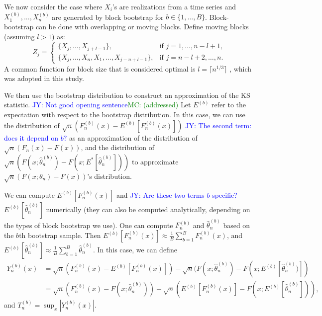 \documentclass[12pt, titlepage, letterpaper]{article}
\newcommand{\jy}[1]{\textcolor{blue}{JY: #1}}
\newcommand{\mc}[1]{\textcolor{green}{MC: (#1)}}
\begin{document}
{We now consider the case where $X_i$'s are realizations from a time series and
$X^{(b)}_1,...,X^{(b)}_n$ are generated by block bootstrap for 
$b \in \{1, \ldots, B\}$.  
Block-bootstrap can be done with overlapping or moving blocks.
Define 
moving blocks (assuming $l > 1$) as:
\begin{equation*}
Z_j =
    \begin{cases}
        \{X_j, \ldots, X_{j + l - 1}\}, & \text{if } j = 1, \dots, n - l + 1,\\
        \{X_j, \ldots, X_n, X_1, \ldots, X_{j-n+l-1}\}, & \text{if } j = n - l
        + 2 ,\dots, n.
    \end{cases}
\end{equation*}
A common 
function for block size that is considered optimal is 
$l = \lceil n^{1/3} \rceil$ \citep{buhlmann1999block},  
which was adopted in this study.


We then use the bootstrap distribution to construct an approximation of
the KS statistic.
\jy{Not good opening sentence}\mc{addressed}
Let $E^{(b)}$ refer to the expectation with respect to
the bootstrap distribution. In this case, we can 
use the distribution of $\sqrt{n}(F^{(b)}_n(x) - E^{(b)}[F^{(b)}_n(x)])$
\jy{The second term: does it depend on $b$? }
as an approximation of the distribution of
$\sqrt{n}(F_n(x) - F(x))$,
and the distribution of 
$\sqrt{n}(F(x; \hat\theta^{(b)}_n) - F(x; E^*[\hat\theta^{(b)}_n]))$ to
approximate $\sqrt{n}(F(x; \theta_n) - F(x))$'s distribution.


We can compute $E^{(b)}[F^{(b)}_n(x)]$ and
\jy{Are these two terms $b$-specific?}
$E^{(b)}[\hat\theta^{(b)}_n]$ numerically (they can also be computed analytically, 
depending on the types of block bootstrap we use). One can compute 
$F^{(b)}_n$ 
and $\hat\theta^{(b)}_n$ based on
the $b$th bootstrap sample. Then
$E^{(b)}[F^{(b)}_n(x)] \approx \frac{1}{B}\sum_{b = 1}^BF^{(b)}_n(x)$, and
$E^{(b)}[\hat\theta^{(b)}_n] \approx \frac{1}{B}\sum_{b = 1}^B\hat\theta^{(b)}_n$.
In this case, we can define
\begin{align*}
  Y^{(b)}_n(x) &= \sqrt{n}(F^{(b)}_n(x) - E^{(b)}[F^{(b)}_n(x)]) - 
             \sqrt{n}(F(x; \hat\theta^{(b)}_n) - F(x; E^{(b)}[\hat\theta^{(b)}_n)]) \\
           &= \sqrt{n}(F^{(b)}_n(x) - F(x; \hat\theta^{(b)}_n)) -
             \sqrt{n}(E^{(b)}[F^{(b)}_n(x)] - F(x; E^{(b)}[\hat\theta^{(b)}_n])),
\end{align*}
and $T^{(b)}_n = \sup_x|Y^{(b)}_n(x)|$.


}
\end{document}
